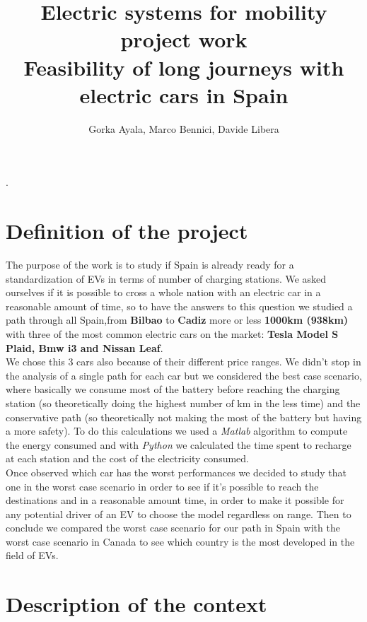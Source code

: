 \documentclass{article}
\title{\textbf{Electric systems for mobility project work\\
\large Feasibility of long journeys with electric cars in Spain}}
\author{Gorka Ayala, Marco Bennici, Davide Libera}
\date{}
\begin{document}
\setlength{\parindent}{0pt}.
\begin{titlepage}

\maketitle

\tableofcontents
\end{titlepage}

\section{Definition of the project}
\bigskip
The purpose of the work is to study if Spain is already ready for a standardization of EVs in terms of number of charging stations. We asked ourselves if it is possible to cross a whole nation with an electric car in a reasonable amount of time, so to have the answers to this question we studied a path through all Spain,from \textbf{Bilbao} to \textbf{Cadiz} more or less \textbf{1000km (938km)} with three of the most common electric cars on the market: \textbf{Tesla Model S Plaid, Bmw i3 and Nissan Leaf}. \\

We chose this 3 cars also because of their different price ranges. We didn't stop in the analysis of a single path for each car but we considered the best case scenario, where basically we consume most of the battery before reaching the charging station (so theoretically doing the highest number of km in the less time) and the conservative path (so theoretically not making the most of the battery but having a more safety). To do this calculations we used a \textit{Matlab} algorithm to compute the energy consumed and with \textit{Python} we calculated the time spent to recharge at each station and the cost of the electricity consumed.\\

Once observed which car has the worst performances we decided to study that one in the worst case scenario in order to see if it’s possible to reach the destinations and in a reasonable amount time, in order to make it possible for any potential driver of an EV to choose the model regardless on range. Then to conclude we compared the worst case scenario for our path in Spain with the worst case scenario in Canada to see which country is the most developed in the field of EVs.\\

\section{Description of the context}
\end{document}
